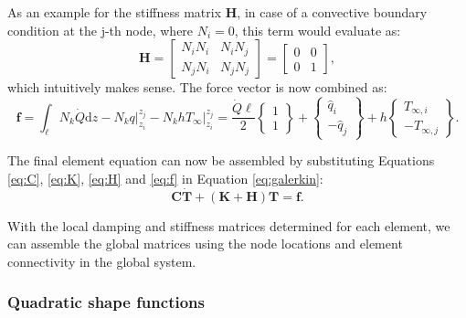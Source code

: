 \documentclass[10pt, a4paper, twoside, headinclude,footinclude, BCOR5mm]{scrartcl}
\begin{document}
As an example for the stiffness matrix \(\mathbf{H}\), in case of a convective boundary condition at the j-th node, where \(N_i = 0\), this term would evaluate as:
\begin{equation*}
  \mathbf{H} = \left[\begin{matrix} N_i N_i & N_i N_j \\
                                  N_j N_i & N_j N_j \end{matrix}\right] =
             \left[\begin{matrix} 0 & 0 \\
                                  0 & 1 \end{matrix}\right],
\end{equation*}
which intuitively makes sense. The force vector is now combined as:
\begin{equation}
\mathbf{f} = \int_\ell N_k \dot{Q} \text{d}z - N_k q \Biggr|_{z_i}^{z_j} -          N_k h T_{\infty} \Biggr|_{z_i}^{z_j} =
           \frac{\dot{Q}\ell}{2}\begin{Bmatrix} 1 \\ 1\end{Bmatrix} +
           \begin{Bmatrix}  \hat{q}_i \\
                            -\hat{q}_j \end{Bmatrix} +
           h\begin{Bmatrix}  T_{\infty,i} \\
                             -T_{\infty,j} \end{Bmatrix}.
\label{eq:f}
\end{equation}

The final element equation can now be assembled by substituting Equations \ref{eq:C}, \ref{eq:K}, \ref{eq:H} and \ref{eq:f} in Equation \ref{eq:galerkin}:
\begin{equation*}
\mathbf{C}\mathbf{\dot{T}} + (\mathbf{K} + \mathbf{H})\mathbf{T} = \mathbf{f}.
\end{equation*}

With the local damping and stiffness matrices determined for each element, we can assemble  the global matrices using the node locations and element connectivity  in the global system.

\subsubsection{Quadratic shape functions}
\label{sec:org6987193}
\end{document}
